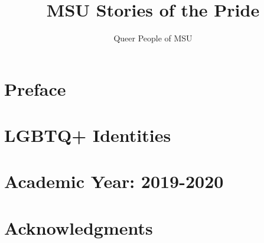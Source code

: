 \documentclass[12pt,letterpaper,footinclude=true,headinclude=true]{book} %
\title{MSU Stories of the Pride}
\author{Queer People of MSU}
\date{}  %
\begin{document}
	\maketitle
	
	\tableofcontents 
	
	
	
	\chapter*{Preface}
	
	
	\chapter{LGBTQ+ Identities}
	
	
	\chapter{Academic Year: 2019-2020}
	
	
	\chapter*{Acknowledgments}
	
	
	
	{
		
		
		
	}
\end{document}
